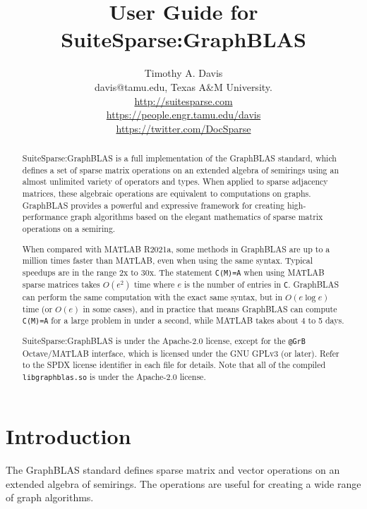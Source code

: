 \documentclass[12pt]{article}
\title{User Guide for SuiteSparse:GraphBLAS}
\author{Timothy A. Davis \\
\small
davis@tamu.edu, Texas A\&M University. \\
\small
\url{http://suitesparse.com} \\
\small
\url{https://people.engr.tamu.edu/davis} \\
\small
\url{https://twitter.com/DocSparse}
}
\begin{document}
\maketitle

\begin{abstract}
SuiteSparse:GraphBLAS is a full implementation of the GraphBLAS standard,
which defines a set of sparse matrix operations on an extended algebra of
semirings using an almost unlimited variety of operators and types.  When
applied to sparse adjacency matrices, these algebraic operations are equivalent
to computations on graphs.  GraphBLAS provides a powerful and expressive
framework for creating high-performance graph algorithms based on the elegant
mathematics of sparse matrix operations on a semiring.

When compared with MATLAB R2021a, some methods in GraphBLAS are up to
a million times faster than MATLAB, even when using the same syntax.
Typical speedups are in the range 2x to 30x.
The statement \verb'C(M)=A' when using MATLAB sparse matrices takes
$O(e^2)$ time where $e$ is the number of entries in \verb'C'.  GraphBLAS
can perform the same computation with the exact same syntax, but
in $O(e \log e)$ time (or $O(e)$ in some cases), and in practice that
means GraphBLAS can compute \verb'C(M)=A' for a large problem in under
a second, while MATLAB takes about 4 to 5 days.

SuiteSparse:GraphBLAS is under the Apache-2.0 license, except for the
\verb'@GrB' Octave/MATLAB interface, which is licensed under the GNU GPLv3 (or
later).  Refer to the SPDX license identifier in each file for details.  Note
that all of the compiled \verb'libgraphblas.so' is under the Apache-2.0
license.

\end{abstract}

\newpage
{\small
\tableofcontents
}

\newpage
\section{Introduction} %
\label{intro}

The GraphBLAS standard defines sparse matrix and vector operations on an
extended algebra of semirings.  The operations are useful for creating a wide
range of graph algorithms.
\end{document}
